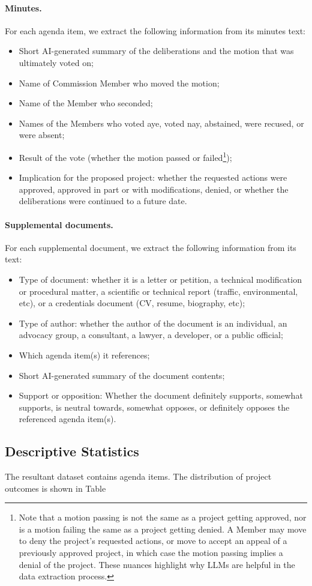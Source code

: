 \paragraph{Minutes.} For each agenda item, we extract the following information from its minutes text:
\begin{itemize}
\item Short AI-generated summary of the deliberations and the motion that was ultimately voted on;
\item Name of Commission Member who moved the motion;
\item Name of the Member who seconded;
\item Names of the Members who voted aye, voted nay, abstained, were recused, or were absent;
\item Result of the vote (whether the motion passed or failed\footnote{Note that a motion passing is not the same as a project getting approved, nor is a motion failing the same as a project getting denied. A Member may move to deny the project's requested actions, or move to accept an appeal of a previously approved project, in which case the motion passing implies a denial of the project. These nuances highlight why LLMs are helpful in the data extraction process.});
\item Implication for the proposed project: whether the requested actions were approved, approved in part or with modifications, denied, or whether the deliberations were continued to a future date.
\end{itemize}

\paragraph{Supplemental documents.} For each supplemental document, we extract the following information from its text:
\begin{itemize}
\item Type of document: whether it is a letter or petition, a technical modification or procedural matter, a scientific or technical report (traffic, environmental, etc), or a credentials document (CV, resume, biography, etc); 
\item Type of author: whether the author of the document is an individual, an advocacy group, a consultant, a lawyer, a developer, or a public official;
\item Which agenda item(s) it references;
\item Short AI-generated summary of the document contents;
\item Support or opposition: Whether the document definitely supports, somewhat supports, is neutral towards, somewhat opposes, or definitely opposes the referenced agenda item(s).
\end{itemize}

\subsection{Descriptive Statistics} \label{sec_descriptive_statistics}

The resultant dataset contains  agenda items. The distribution of project outcomes is shown in Table 
